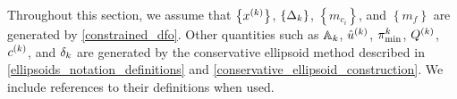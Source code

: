 \begin{enumerate}
\end{enumerate}

Throughout this section, we assume that 
$\left\{x^{(k)}\right\}$,
$\left\{\Delta_k\right\}$,
$\left\{m_{c_i}\right\}$,
and
$\left\{m_{f}\right\}$
are generated by 
\cref{constrained_dfo}.
Other quantities such as ${\mathbb A_{k}}$, ${{\hat u}^{(k)}}$, ${\pi^k_{\textrm{min}}}$, ${Q^{(k)}}$, $c^{(k)}$, and $\delta_k$ 
are generated by the conservative ellipsoid method described in
\cref{ellipsoids_notation_definitions} and \cref{conservative_ellipsoid_construction}.
We include references to their definitions when used.  

